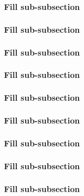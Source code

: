 \subsubsection{Fill sub-subsection}

\lipsum[4]

\subsubsection{Fill sub-subsection}

\lipsum[4]

\subsubsection{Fill sub-subsection}

\lipsum[4]

\subsubsection{Fill sub-subsection}

\lipsum[4]

\subsubsection{Fill sub-subsection}

\lipsum[4]

\subsubsection{Fill sub-subsection}

\lipsum[4]

\subsubsection{Fill sub-subsection}

\lipsum[4]

\subsubsection{Fill sub-subsection}

\lipsum[4]

\subsubsection{Fill sub-subsection}

\lipsum[4]